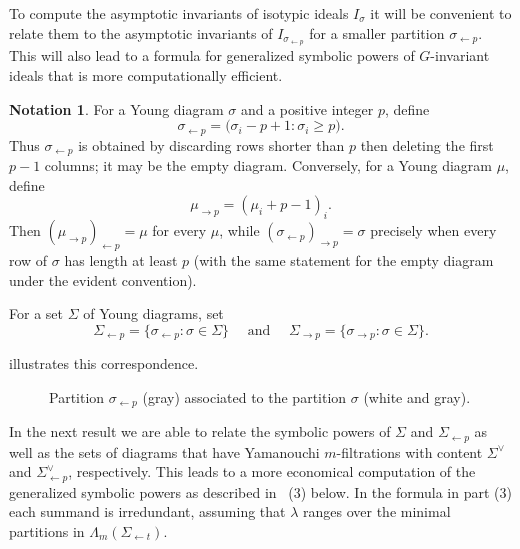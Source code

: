 \documentclass[11pt, reqno]{amsart}
\numberwithin{equation}{section}
\theoremstyle{definition}
\newtheorem{notation}[theorem]{Notation}
\renewcommand{\l}{\lambda}
\newcommand{\s}{\sigma}
\begin{document}
To compute the asymptotic invariants of isotypic ideals  $I_\s$ it will be convenient to relate them to the asymptotic invariants of $I_{\s_{\leftarrow p}}$ for a smaller partition $\s_{\leftarrow p}$. This will also lead to a formula for generalized symbolic powers of $G$-invariant ideals that is more computationally efficient.

\begin{notation}\label{not: s'}
For a Young diagram $\sigma$ and a positive integer $p$, define
\[
\sigma_{\leftarrow p}
=\bigl(\sigma_i-p+1:\sigma_i\geq p\bigr).
\]
Thus $\sigma_{\leftarrow p}$ is obtained by discarding rows shorter than $p$ then deleting the first $p-1$ columns; it may be the empty diagram. Conversely, for a Young diagram $\mu$, define
\[
\mu_{\rightarrow p}=(\mu_i+p-1)_i.
\]
Then $(\mu_{\rightarrow p})_{\leftarrow p}=\mu$ for every $\mu$, while
$(\sigma_{\leftarrow p})_{\rightarrow p}=\sigma$ precisely when every row of $\sigma$ has length at least $p$ (with the same statement for the empty diagram under the evident convention).

For a set $\Sigma$ of Young diagrams, set
\[
\Sigma_{\leftarrow p}=\{\sigma_{\leftarrow p}:\sigma\in\Sigma\}
\quad \text{ and } \quad
\Sigma_{\rightarrow p}=\{\sigma_{\rightarrow p}:\sigma\in\Sigma\}.
\]

 illustrates this correspondence.

\begin{figure}[h]
		\caption{Partition $\s_{\leftarrow p}$ (gray) associated to the partition $\s$ (white and gray).}\label{fig5}
\end{figure}

\end{notation}

In the next result we are able to relate the symbolic powers of $\Sigma$ and $\Sigma_{\leftarrow p}$ as well as the sets of diagrams that have Yamanouchi $m$-filtrations with content $\Sigma^\vee$ and $\Sigma_{\leftarrow p}^\vee$, respectively. This leads to a more economical computation of the generalized symbolic powers as described in ~(3) below.  In the formula in part (3) each summand is irredundant, assuming that $\l$ ranges over the minimal partitions  in $\Lambda_m(\Sigma_{\leftarrow t})$.
\end{document}
